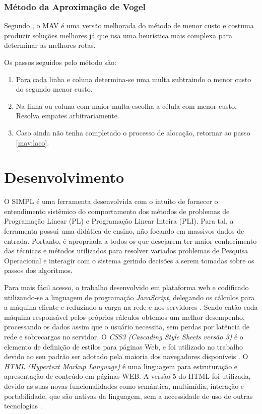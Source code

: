 \documentclass [11pt]{articleSBPO}
\begin{document}
\subsubsection{Método da Aproximação de Vogel}\label{subsubsec:mav}

Segundo \cite{taha}, o MAV é uma versão melhorada do método de menor custo e costuma produzir soluções melhores já que usa uma heurística mais complexa para determinar as melhores rotas.

Os passos seguidos pelo método são:

\begin{enumerate}
	\item Para cada linha e coluna determina-se uma multa subtraindo o menor custo do segundo menor custo. \label{mav:laco}
	\item Na linha ou coluna com maior multa escolha a célula com menor custo. Resolva empates arbitrariamente.
	\item Caso ainda não tenha completado o processo de alocação, retornar ao passo \ref{mav:laco}.
\end{enumerate}


\section{Desenvolvimento}\label{sec:desenvolvimento}

O SIMPL é uma ferramenta desenvolvida com o intuito de fornecer o entendimento sistêmico do comportamento dos métodos de problemas de Programação Linear (PL) e Programação Linear Inteira (PLI). Para tal, a ferramenta possui uma didática de ensino, não focando em massivos dados de entrada. Portanto, é apropriada a todos os que desejarem ter maior conhecimento das técnicas e métodos utilizados para resolver variados problemas de Pesquisa Operacional e interagir com o sistema gerindo decisões a serem tomadas sobre os passos dos algoritmos.

Para mais fácil acesso, o trabalho desenvolvido em plataforma web e codificado utilizando-se a linguagem de programação \textit{JavaScript}, delegando os cálculos para a máquina cliente e reduzindo a carga na rede e nos servidores \cite{livrojavascript1}. Sendo então cada máquina responsável pelos próprios cálculos obtemos um melhor desempenho, processando os dados assim que o usuário necessita, sem perdas por latência de rede e sobrecargas no servidor. O \textit{CSS3 (Cascading Style Sheets versão 3)} é o elemento de definição de estilos para páginas Web, e foi utilizado no trabalho devido ao seu padrão ser adotado pela maioria dos navegadores disponíveis \cite{livroweb2}. O \textit{HTML (Hypertext Markup Language)} é uma linguagem para estruturação e apresentação de conteúdo em páginas WEB. A versão 5 do HTML foi utilizada, devido as suas novas funcionalidades como semântica, multimídia, interação e portabilidade, que são nativas da linguagem, sem a necessidade de uso de outras tecnologias \cite{livroweb1}.
\end{document}
